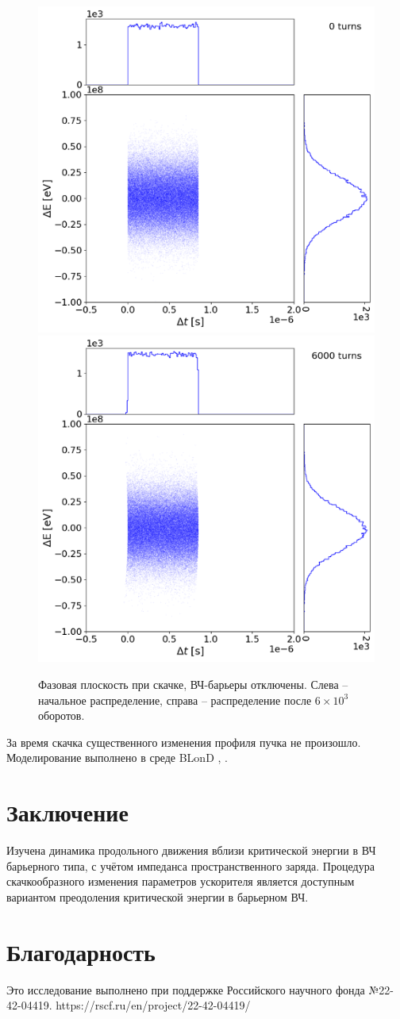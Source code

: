 \documentclass[a4paper]{panl}
\begin{document}
\begin{figure}[!h]
   \includegraphics*[width=.49\columnwidth]{img/fig_09-1}
   \includegraphics*[width=.49\columnwidth]{img/fig_09-2}
   \caption{Фазовая плоскость при скачке, ВЧ-барьеры отключены. Слева – начальное распределение, справа – распределение после $6\times{10}^3$ оборотов.}
   \label{fig:3}
\end{figure}

\par За время скачка существенного изменения профиля пучка не про\-и\-зош\-ло. Моделирование выполнено в среде BLonD \cite{blond1}, \cite{blond}.


\label{sec:conc}
\section*{Заключение}
\par Изучена динамика продольного движения вблизи критической э\-нер\-гии в ВЧ барьерного типа, с учётом импеданса пространственного заряда. Процедура скачкообразного изменения параметров ускорителя является доступным вариантом преодоления критической энергии в барьерном ВЧ.

\label{sec:acknowlegments}
\section*{Благодарность}
Это исследование выполнено при поддержке Российского научного фонда №22-42-04419. https://rscf.ru/en/project/22-42-04419/
\end{document}

